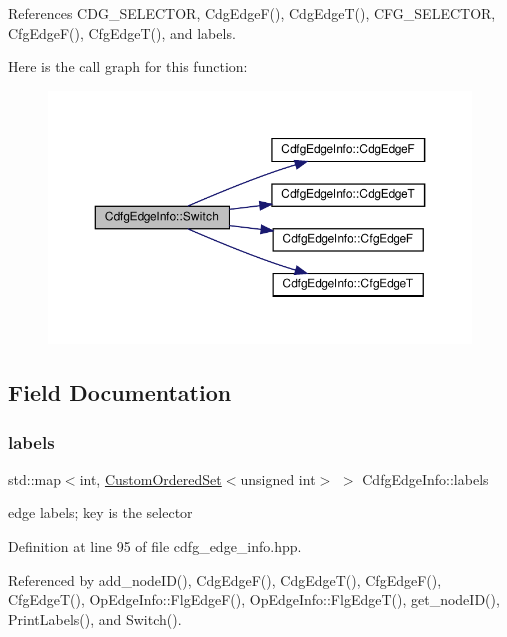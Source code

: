 References C\+D\+G\+\_\+\+S\+E\+L\+E\+C\+T\+OR, Cdg\+Edge\+F(), Cdg\+Edge\+T(), C\+F\+G\+\_\+\+S\+E\+L\+E\+C\+T\+OR, Cfg\+Edge\+F(), Cfg\+Edge\+T(), and labels.

Here is the call graph for this function\+:
\nopagebreak
\begin{figure}[H]
\begin{center}
\leavevmode
\includegraphics[width=350pt]{d0/d89/structCdfgEdgeInfo_a8b1bf37fa377e0c01cb6e813e9df6a66_cgraph}
\end{center}
\end{figure}


\subsection{Field Documentation}
\mbox{\label{structCdfgEdgeInfo_a9ef9bbae9b574d8bdc11007b7f240aa6}} 
\subsubsection{\texorpdfstring{labels}{labels}}
{\footnotesize\ttfamily std\+::map$<$int, \hyperlink{classCustomOrderedSet}{Custom\+Ordered\+Set}$<$unsigned int$>$ $>$ Cdfg\+Edge\+Info\+::labels\hspace{0.3cm}{\ttfamily [protected]}}



edge labels; key is the selector 



Definition at line 95 of file cdfg\+\_\+edge\+\_\+info.\+hpp.



Referenced by add\+\_\+node\+I\+D(), Cdg\+Edge\+F(), Cdg\+Edge\+T(), Cfg\+Edge\+F(), Cfg\+Edge\+T(), Op\+Edge\+Info\+::\+Flg\+Edge\+F(), Op\+Edge\+Info\+::\+Flg\+Edge\+T(), get\+\_\+node\+I\+D(), Print\+Labels(), and Switch().



